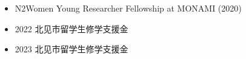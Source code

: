 \documentclass{resume}
\begin{document}
\begin{itemize}
  \item N2Women Young Researcher Fellowship at MONAMI (2020)
  \item 2022 北见市留学生修学支援金
  \item 2023 北见市留学生修学支援金
\end{itemize}

%
%
\end{document}

